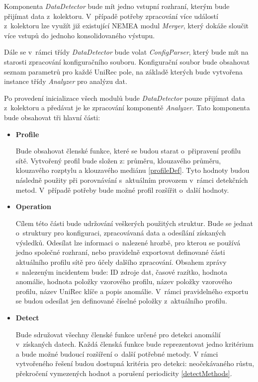  Komponenta \textit{DataDetector} bude mít jedno vstupní rozhraní, kterým bude přijímat data z~kolektoru.
 V~případě potřeby
 zpracování více událostí z~kolektoru lze využít již existující NEMEA modul \textit{Merger}, který
 dokáže sloučit více vstupů do jednoho konsolidovaného výstupu. 
 
 Dále se v~rámci třídy \textit{DataDetector} bude volat \textit{ConfigParser}, který bude mít na starosti zpracování 
 konfiguračního souboru. Konfigurační soubor bude obsahovat seznam parametrů pro každé UniRec pole,
 na základě kterých bude vytvořena instance třídy \textit{Analyzer} pro analýzu dat. 
 
 Po provedení inicializace všech modulů bude \textit{DataDetector} pouze přijímat data z~kolektoru a 
 předávat je ke zpracování komponentě \textit{Analyzer}. Tato komponenta bude obsahovat
 tři hlavní části:
 \begin{itemize}
  \item \textbf{Profile}
  
  Bude obsahovat členské funkce, které se budou starat o~připravení profilu sítě. 
  Vytvořený profil bude složen z: průměru, klouzavého průměru, klouzavého
  rozptylu a klouzavého mediánu \ref{profileDef}.
  Tyto hodnoty budou následně použity při porovnávání s~aktuálním provozem v~rámci detekčních
  metod. V~případě potřeby bude možné profil rozšířit o~další hodnoty.
  
   \item \textbf{Operation}
  
  Cílem této části bude udržování veškerých použitých struktur. Bude se jednat o~struktury 
  pro konfiguraci, zpracovávaná data a odesílání získaných výsledků. Odesílat lze informaci
o~nalezené hrozbě, pro kterou se používá jedno společné rozhraní, nebo pravidelně exportovat
  definované části aktuálního profilu sítě pro účely dalšího zpracování. Obsahem zprávy s~nalezeným
  incidentem bude: ID zdroje dat, časové razítko, hodnota anomálie, hodnota položky vzorového profilu, 
  název položky vzorového profilu, název UniRec klíče a popis anomálie. V~rámci pravidelného exportu
  se budou odesílat jen definované číselné položky z~aktuálního profilu.
  
  \item \textbf{Detect}
  
  Bude sdružovat všechny členské funkce určené pro detekci anomálií v~získaných datech. 
  Každá členská funkce bude reprezentovat jedno kritérium a bude možné budoucí rozšíření o~další
  potřebné metody. V rámci vytvořeného řešení budou dostupná kritéria pro detekci: neočekávaného
  růstu, překročení vymezených hodnot a porušení periodicity \ref{detectMethods}.
  
 \end{itemize}

